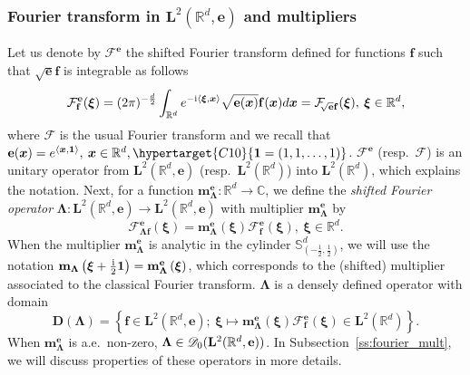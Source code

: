 \documentclass[12pt]{amsart}
\newcommand{\hptg}[2]{\hypertarget{#1}{#2}}
\numberwithin{equation}{section}
\newcommand{\bb}{\mathbb}
\newcommand{\hpt}[2]{#2}
\newcommand{\bmrm}[2][2]{\mathbf{#2}^{#1}}
\newcommand{\fou}{\mathcal{F}}
\newcommand{\fouh}{\mathcal{F}^{\mathbf{e}}}
\newcommand{\D}{\mathbf{D}}
\newcommand{\LL}{\Lambda}
\newcommand{\mm}{\mathbf{m}}
\newcommand{\f}{\mathbf{f}}
\theoremstyle{definition}
\newtheorem{definition}[thm]{Definition}
\theoremstyle{assump}
\theoremstyle{remark}
\begin{document}
\subsubsection{Fourier transform in $\bmrm{L}(\bb{R}^d,\mathbf{e})$ and multipliers}
Let us denote by $\fouh$ the shifted Fourier transform   %
defined for functions $\f$ such that $\sqrt{\mathbf{e}}\f$ is integrable as follows
\begin{align}
	\fouh_{\f}(\bm{\xi})=(2\pi)^{-\frac{d}{2}}\int_{\bb{R}^d}e^{-{\rm{i}}\langle\bm{\xi}, \bm{x}\rangle}\sqrt{\mathbf{e}(\bm{x})}\f(\bm{x})d\bm{x}=\fou_{\!\!\sqrt{\mathbf{e}}\f}(\bm{\xi}), \: \bm{\xi}\in\bb{R}^d,
\end{align}
where $\fou$ is the usual Fourier transform and we recall that
$\mathbf{e}(\bm{x})=e^{\langle \bm{x},\bm{1}\rangle}, \: \bm{x}\in\bb{R}^d, \hptg{C10}{\bm{1}=(1,1,\ldots, 1)}$.  $\fouh$ (resp.~$\fou$) is  an unitary operator from $\bmrm{L}(\bb{R}^d,\mathbf{e})$ (resp.~$\bmrm{L}(\bb{R}^d)$) into $\bmrm{L}(\bb{R}^d)$, which explains the notation.  %
\hptg{C11}{
Next, for a function $\mathbf{m}^{\mathbf{e}}_{\bm{\LL}}:\bb{R}^d\to\bb{C}$, we define the \emph{shifted Fourier  operator} $\bm{\LL}:\bmrm{L}(\bb{R}^d,\mathbf{e})\to\bmrm{L}(\bb{R}^d,\mathbf{e})$ with multiplier $\mm^{\mathbf{e}}_{\bm{\LL}}$ by
	\begin{equation}
		\fouh_{\bm{\LL} \f}(\bm{\xi})=\mm^{\mathbf{e}}_{\bm{\LL}}\left(\bm{\xi}\right)\fouh_{\f}(\bm{\xi}), \ \bm{\xi}\in\bb{R}^d.
	\end{equation}
	When the multiplier $\mm^{\mathbf{e}}_{\bm{\LL}}$ is analytic in the cylinder \hpt{R2}{$\bb{S}^d_{(-\frac12,\frac12)}$}, we will  use the notation $\mm_{\bm{\LL}}\left(\bm{\xi}+\frac{{\rm{i}}}{2}\bm{1}\right)=\mm^{\mathbf{e}}_{\bm{\LL}}\left(\bm{\xi}\right)$, which corresponds to the (shifted) multiplier associated to the classical Fourier transform.}
	$\bm{\LL}$ is a densely defined operator with domain
	\begin{equation}
		\D(\bm{\LL})=\left\{\f\in\bmrm{L}(\bb{R}^d,\mathbf{e}); \: \bm{\xi} \mapsto \mm^{\mathbf{e}}_{\bm{\LL}}\left(\bm{\xi}\right)\fouh_ {\f}(\bm{\xi})\in\bmrm{L}(\bb{R}^d)\right\}.
	\end{equation}
\noindent
When $\mm^{\mathbf{e}}_{\bm{\LL}}$ is a.e.~non-zero, $\bm{\LL}\in \mathscr{D}_0(\bmrm{L}(\bb R^d,{\bf e}))$. In  Subsection~\ref{ss:fourier_mult}, we will discuss properties of these operators in more details.
\end{document}
